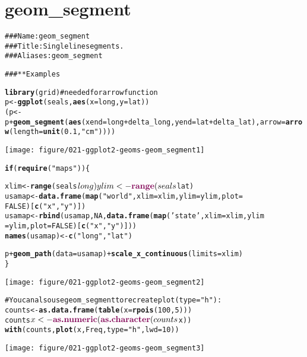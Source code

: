 \documentclass[a4paper,titlepage]{tufte-handout}\usepackage{graphicx, color}
\makeatletter
\def\maxwidth{ %
  \ifdim\Gin@nat@width>\linewidth
    \linewidth
  \else
    \Gin@nat@width
  \fi
}
\newcommand{\hlfunctioncall}[1]{\textcolor[rgb]{0.501960784313725,0,0.329411764705882}{\textbf{#1}}}%
\newcommand{\hlstring}[1]{\textcolor[rgb]{0.6,0.6,1}{#1}}%
\newcommand{\hlcomment}[1]{\textcolor[rgb]{0.180392156862745,0.6,0.341176470588235}{#1}}%
\newenvironment{kframe}{%
 \def\at@end@of@kframe{}%
 \ifinner\ifhmode%
  \def\at@end@of@kframe{\end{minipage}}%
  \begin{minipage}{\columnwidth}%
 \fi\fi%
 \def\FrameCommand##1{\hskip\@totalleftmargin \hskip-\fboxsep
 \colorbox{shadecolor}{##1}\hskip-\fboxsep
     \hskip-\linewidth \hskip-\@totalleftmargin \hskip\columnwidth}%
 \MakeFramed {\advance\hsize-\width
   \@totalleftmargin\z@ \linewidth\hsize
   \@setminipage}}%
 {\par\unskip\endMakeFramed%
 \at@end@of@kframe}
\newenvironment{knitrout}{}{} %
\makeatother
\begin{document}
\section{geom\_segment}

\begin{knitrout}
\color{fgcolor}\begin{kframe}
\begin{alltt}
\hlcomment{### Name: geom_segment}
\hlcomment{### Title: Single line segments.}
\hlcomment{### Aliases: geom_segment}

\hlcomment{### ** Examples}

\hlfunctioncall{library}(grid) \hlcomment{# needed for arrow function}
p <- \hlfunctioncall{ggplot}(seals, \hlfunctioncall{aes}(x = long, y = lat))
(p <- p + \hlfunctioncall{geom_segment}(\hlfunctioncall{aes}(xend = long + delta_long, yend = lat + delta_lat), arrow = \hlfunctioncall{arrow}(length = \hlfunctioncall{unit}(0.1,\hlstring{"cm"}))))
\end{alltt}
\end{kframe}
\texttt{[image: figure/021-ggplot2-geoms-geom\_segment1]} 
\begin{kframe}\begin{alltt}

\hlfunctioncall{if} (\hlfunctioncall{require}(\hlstring{"maps"})) \{

xlim <- \hlfunctioncall{range}(seals$long)
ylim <- \hlfunctioncall{range}(seals$lat)
usamap <- \hlfunctioncall{data.frame}(\hlfunctioncall{map}(\hlstring{"world"}, xlim = xlim, ylim = ylim, plot =
FALSE)[\hlfunctioncall{c}(\hlstring{"x"},\hlstring{"y"})])
usamap <- \hlfunctioncall{rbind}(usamap, NA, \hlfunctioncall{data.frame}(\hlfunctioncall{map}(\hlstring{'state'}, xlim = xlim, ylim
= ylim, plot = FALSE)[\hlfunctioncall{c}(\hlstring{"x"},\hlstring{"y"})]))
\hlfunctioncall{names}(usamap) <- \hlfunctioncall{c}(\hlstring{"long"}, \hlstring{"lat"})

p + \hlfunctioncall{geom_path}(data = usamap) + \hlfunctioncall{scale_x_continuous}(limits = xlim)
\}
\end{alltt}
\end{kframe}
\texttt{[image: figure/021-ggplot2-geoms-geom\_segment2]} 
\begin{kframe}\begin{alltt}

\hlcomment{# You can also use geom_segment to recreate plot(type = "h") :}
counts <- \hlfunctioncall{as.data.frame}(\hlfunctioncall{table}(x = \hlfunctioncall{rpois}(100,5)))
counts$x <- \hlfunctioncall{as.numeric}(\hlfunctioncall{as.character}(counts$x))
\hlfunctioncall{with}(counts, \hlfunctioncall{plot}(x, Freq, type = \hlstring{"h"}, lwd = 10))
\end{alltt}
\end{kframe}
\texttt{[image: figure/021-ggplot2-geoms-geom\_segment3]} 
\begin{kframe}\begin{alltt}


\end{alltt}
\end{kframe}
\end{knitrout}
\end{document}
